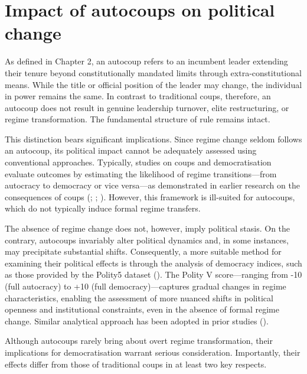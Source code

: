 \documentclass[
  12pt,
]{report}
\begin{document}
\section{Impact of autocoups on political
change}\label{impact-of-autocoups-on-political-change}

As defined in Chapter 2, an autocoup refers to an incumbent leader
extending their tenure beyond constitutionally mandated limits through
extra-constitutional means. While the title or official position of the
leader may change, the individual in power remains the same. In contrast
to traditional coups, therefore, an autocoup does not result in genuine
leadership turnover, elite restructuring, or regime transformation. The
fundamental structure of rule remains intact.

This distinction bears significant implications. Since regime change
seldom follows an autocoup, its political impact cannot be adequately
assessed using conventional approaches. Typically, studies on coups and
democratisation evaluate outcomes by estimating the likelihood of regime
transitions---from autocracy to democracy or vice versa---as
demonstrated in earlier research on the consequences of coups
(;
;
). However, this framework is
ill-suited for autocoups, which do not typically induce formal regime
transfers.

The absence of regime change does not, however, imply political stasis.
On the contrary, autocoups invariably alter political dynamics and, in
some instances, may precipitate substantial shifts. Consequently, a more
suitable method for examining their political effects is through the
analysis of democracy indices, such as those provided by the Polity5
dataset (). The Polity
V score---ranging from -10 (full autocracy) to +10 (full
democracy)---captures gradual changes in regime characteristics,
enabling the assessment of more nuanced shifts in political openness and
institutional constraints, even in the absence of formal regime change.
Similar analytical approach has been adopted in prior studies
().

Although autocoups rarely bring about overt regime transformation, their
implications for democratisation warrant serious consideration.
Importantly, their effects differ from those of traditional coups in at
least two key respects.
\end{document}
